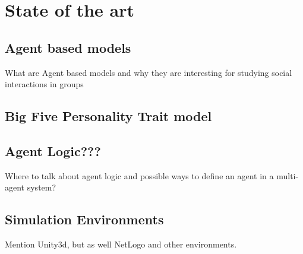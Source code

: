 \chapter{State of the art}

\section{Agent based models}
What are Agent based models and why they are interesting for studying social interactions in groups

\section{Big Five Personality Trait model}

\section{Agent Logic???}
Where to talk about agent logic and possible ways to define an agent in a multi-agent system?

\section{Simulation Environments}
Mention Unity3d, but as well NetLogo and other environments.
